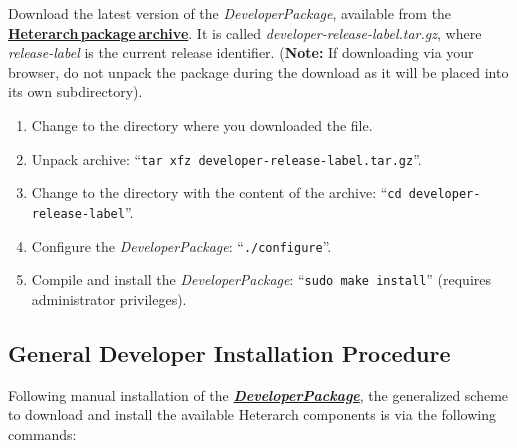 \documentclass[12pt]{article}
\begin{document}
Download the latest version of the {\it DeveloperPackage}, available from the \href{http://repo-genesis3.cbi.utsa.edu/src/}{\bf Heterarch\,package\,archive}.  It is called {\it developer-release-label.tar.gz}, where {\it release-label} is the current release identifier. ({\bf Note:} If downloading via your browser, do not unpack the package during the download as it will be placed into its own subdirectory).
\begin{enumerate}
   \item Change to the directory where you downloaded the file.
   \item Unpack archive: ``{\tt tar xfz developer-release-label.tar.gz}''.
   \item Change to the directory with the content of the archive: ``{\tt cd developer-release-label}''.
   \item Configure the {\it DeveloperPackage}: ``{\tt ./configure}''.
   \item Compile and install the {\it DeveloperPackage}: ``{\tt sudo make install}'' (requires administrator privileges).
\end{enumerate}

\subsection*{General Developer Installation Procedure}

Following manual installation of the \href{../developer-package/developer-package.tex}{\bf{\emph{DeveloperPackage}}}, the generalized scheme to download and install the available Heterarch components
is via the following commands:
\end{document}
